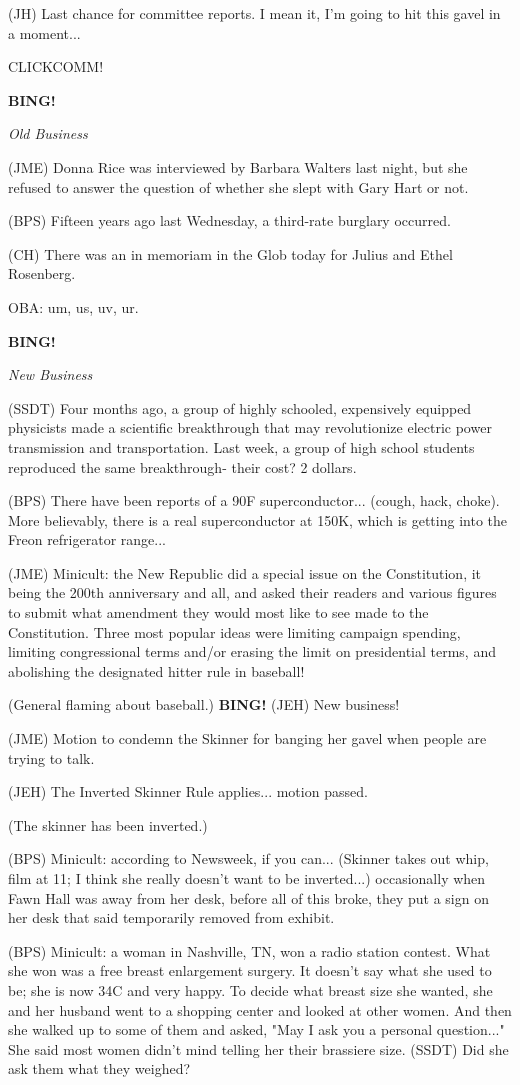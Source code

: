 \documentclass[12pt]{article}
\newcommand{\bing}{{\bf BING!} }
\newcommand{\goto}[1]{\bing \vskip 12pt \centerline{{\em{#1}}}}
\begin{document}
(JH) Last chance for committee reports. I mean it, I'm going to hit this gavel in a moment...

CLICKCOMM!

\goto{Old Business}

(JME) Donna Rice was interviewed by Barbara Walters last night, but she refused to answer the question of whether she slept with Gary Hart or not.

(BPS) Fifteen years ago last Wednesday, a third-rate burglary occurred.

(CH) There was an in memoriam in the Glob today for Julius and Ethel Rosenberg.

OBA: um, us, uv, ur.

\goto{New Business}

(SSDT) Four months ago, a group of highly schooled, expensively equipped physicists made a scientific breakthrough that may revolutionize electric power transmission and transportation. Last week, a group of high school students reproduced the same breakthrough- their cost? 2 dollars.

(BPS) There have been reports of a 90F superconductor... (cough, hack, choke). More believably, there is a real superconductor at 150K, which is getting into the Freon refrigerator range...

(JME) Minicult: the New Republic did a special issue on the Constitution, it being the 200th anniversary and all, and asked their readers and various figures to submit what amendment they would most like to see made to the Constitution. Three most popular ideas were limiting campaign spending, limiting congressional terms and/or erasing the limit on presidential terms, and abolishing the designated hitter rule in baseball!

(General flaming about baseball.) \bing (JEH) New business!

(JME) Motion to condemn the Skinner for banging her gavel when people are trying to talk.

(JEH) The Inverted Skinner Rule applies... motion passed.

(The skinner has been inverted.)

(BPS) Minicult: according to Newsweek, if you can... (Skinner takes out whip, film at 11; I think she really doesn't want to be inverted...) occasionally when Fawn Hall was away from her desk, before all of this broke, they put a sign on her desk that said temporarily removed from exhibit.

(BPS) Minicult: a woman in Nashville, TN, won a radio station contest. What she won was a free breast enlargement surgery. It doesn't say what she used to be; she is now 34C and very happy. To decide what breast size she wanted, she and her husband went to a shopping center and looked at other women. And then she walked up to some of them and asked, "May I ask you a personal question..." She said most women didn't mind telling her their brassiere size. (SSDT) Did she ask them what they weighed?
\end{document}
